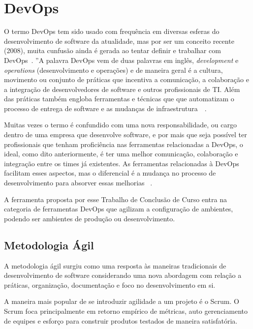 \section{DevOps}
\label{sec:devops}

O termo DevOps tem sido usado com frequência em diversas esferas do
desenvolvimento de software da atualidade, mas por ser um conceito recente
(2008), muita cunfusão ainda é gerada ao tentar definir e trabalhar com
DevOps~\cite{adambertram:2016}. ''A palavra DevOps vem de duas palavras em
inglês, \textit{development} e \textit{operations} (desenvolvimento e operações) e de maneira
geral é a cultura, movimento ou conjunto de práticas que incentiva
a comunicação, a colaboração e a integração de desenvolvedores de software
e outros profissionais de TI. Além das práticas também engloba ferramentas
e técnicas que que automatizam o processo de entrega de software e as mudanças
de infraestrutura~\cite{loukides2012devops}~\cite{erich2014mapping}.

Muitas vezes o termo é confundido com uma nova responsabilidade, ou cargo
dentro de uma empresa que desenvolve software, e por mais que seja possível
ter profissionais que tenham proficiência nas ferramentas relacionadas a
DevOps, o ideal, como dito anteriormente, é ter uma melhor comunicação,
colaboração e integração entre os times já existentes. As ferramentas
relacionadas à DevOps facilitam esses aspectos, mas o diferencial é a
mudança no processo de desenvolvimento para absorver essas melhorias
~\cite{adambertram:2016}.

A ferramenta proposta por esse Trabalho de Conclusão de Curso entra na categoria
de ferramentas DevOps que agilizam a configuração de ambientes, podendo ser ambientes
de produção ou desenvolvimento.


\subsection{Metodologia Ágil}

A metodologia ágil surgiu como uma resposta às maneiras tradicionais de desenvolvimento
de software considerando uma nova abordagem com relação a práticas, organização,
documentação e foco no desenvolvimento em si.~\cite{agilemetorg:2016}

A maneira mais popular de se introduzir agilidade a um projeto é o Scrum. O Scrum
foca principalmente em retorno empírico de métricas, auto gerenciamento de
equipes e esforço para construir produtos testados de maneira 
satisfatória.~\cite{agilemetorg:2016}

